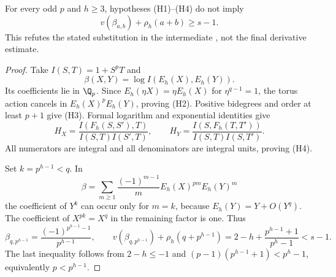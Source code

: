 \begin{proposition}\label{DP28}
For every odd $p$ and $h\ge3$, hypotheses (H1)--(H4) do not imply
\[
 v(\beta_{a,b})+\rho_h(a+b)\ge s-1.
\]
This refutes the stated substitution in the intermediate , not the final derivative estimate.
\end{proposition}
\begin{proof}
Take $I(S,T)=1+S^pT$ and
\[
 \beta(X,Y)=\log I(E_h(X),E_h(Y)).
\]
Its coefficients lie in $\Q_p$. Since $E_h(\eta X)=\eta E_h(X)$ for $\eta^{q-1}=1$, the torus action cancels in $E_h(X)^pE_h(Y)$, proving (H2). Positive bidegrees and order at least $p+1$ give (H3). Formal logarithm and exponential identities give
\[
 H_X=\frac{I(F_h(S,S'),T)}{I(S,T)I(S',T)},\qquad
 H_Y=\frac{I(S,F_h(T,T'))}{I(S,T)I(S,T')}.
\]
All numerators are integral and all denominators are integral units, proving (H4).

Set $k=p^{h-1}<q$. In
\[
 \beta=\sum_{m\ge1}\frac{(-1)^{m-1}}m E_h(X)^{pm}E_h(Y)^m
\]
the coefficient of $Y^k$ can occur only for $m=k$, because $E_h(Y)=Y+O(Y^q)$. The coefficient of $X^{pk}=X^q$ in the remaining factor is one. Thus
\[
 \beta_{q,p^{h-1}}=\frac{(-1)^{p^{h-1}-1}}{p^{h-1}},\qquad
 v(\beta_{q,p^{h-1}})+\rho_h(q+p^{h-1})
 =2-h+\frac{p^{h-1}+1}{p^h-1}<s-1.
\]
The last inequality follows from $2-h\le-1$ and $(p-1)(p^{h-1}+1)<p^h-1$, equivalently $p<p^{h-1}$.
\end{proof}
